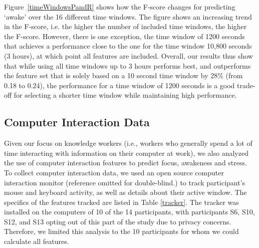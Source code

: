 Figure~\ref{timeWindowsPandR} shows how the F-score changes for predicting 
`awake' over the 16 different time windows. The figure shows an increasing 
trend in the F-score, i.e. the higher the number of included time windows, 
the higher the F-score. However, there is one exception, the time window of 
1200 seconds that achieves a performance close to the one for the time 
window 10,800 seconds (3 hours), at which point all features are included. 
Overall, our results thus show that while using all time windows up to 3 
hours performs best, and outperforms the feature set that is solely based on 
a 10 second time window by 28\% (from 0.18 to 0.24), the performance for a 
time window of 1200 seconds is a good trade-off for selecting a shorter time 
window while maintaining high performance.






\subsection{Computer Interaction Data} \label{secCI}
Given our focus on knowledge workers (i.e., workers who generally spend a lot of time interacting with information on their computer at work), we also analyzed the use of computer interaction features to predict focus, awakeness and stress. To collect computer interaction data, we used an open source computer interaction monitor (reference omitted for double-blind.)
to track participant's mouse and keyboard activity, as well as details about their active window. The specifics of the features tracked are listed in Table \ref{tracker}. The tracker was installed on the computers of 10 of the 14 participants, with participants S6, S10, S12, and S13 opting out of this part of the study due to privacy concerns.  Therefore, we limited this analysis to the 10 participants for whom we could calculate all features. 


